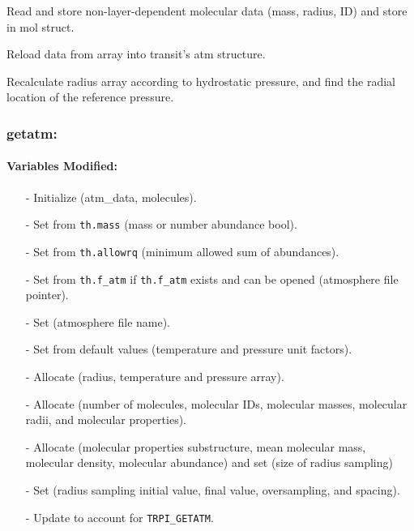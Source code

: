 \documentclass[letterpaper,12pt]{article}
\begin{document}
Read and store non-layer-dependent molecular data (mass, radius, ID)
and store in mol struct. \newline

Reload data from array into transit's atm structure.\newline

Recalculate radius array according to hydrostatic pressure, and find the radial location of the reference pressure.

\subsubsection{getatm:}
\paragraph{Variables Modified:}
\begin{enumerate}[leftmargin=10pt, noitemsep, parsep=0pt, topsep=0ex]
\item[-] Initialize   (atm\_data, molecules).
\item[-] Set  from {\tt th.mass} (mass or
  number abundance bool).
\item[-] Set  from {\tt th.allowrq} (minimum
  allowed sum of abundances).
\item[-] Set  from {\tt th.f\_atm} if {\tt th.f\_atm} exists and can be
  opened (atmosphere file pointer).
\item[-] Set  (atmosphere file name).
\item[-] Set  from
  default values (temperature and pressure unit factors).
\item[-] Allocate  (radius, temperature and pressure array).
\item[-] Allocate  (number of molecules, molecular IDs, molecular masses, molecular radii, and molecular properties).
\item[-] Allocate  (molecular properties substructure, mean molecular mass, molecular density, molecular abundance) and set  (size of radius sampling)
\item[-] Set  (radius sampling initial value, final value,
  oversampling, and spacing).
 \item[-] Update  to account for {\tt TRPI\_GETATM}.
\end{enumerate}
\end{document}
